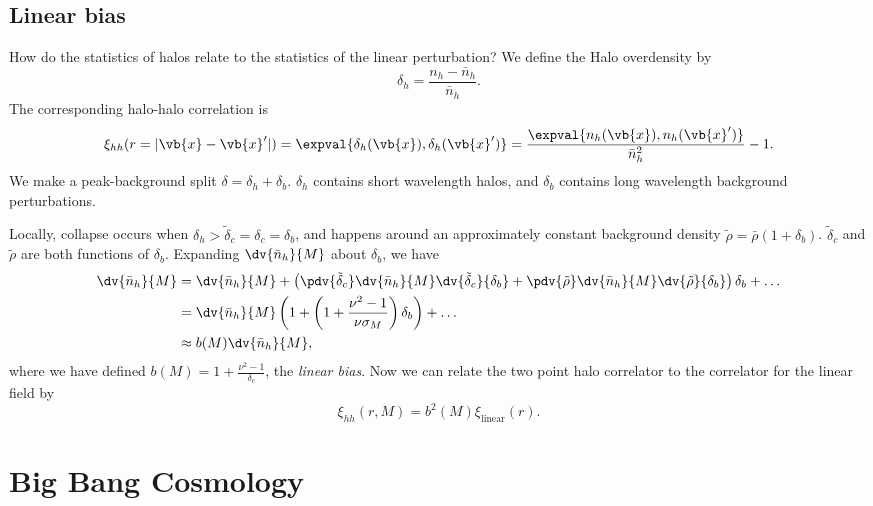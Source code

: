 \documentclass{jknotes}
\begin{document}
\subsection{Linear bias}
How do the statistics of halos relate to the statistics of the linear perturbation? We define the Halo overdensity by
\begin{equation}
    \delta_h = \frac{n_h-\bar{n}_h}{\bar{n}_h}.
\end{equation}
The corresponding halo-halo correlation is 
\begin{equation}
    \xi_{hh}(r=|\vb{x}-\vb{x}'|) = \expval{\delta_h(\vb{x}),\delta_h(\vb{x}')} = \frac{\expval{n_h(\vb{x}),n_h(\vb{x}')}}{\bar{n}_h^2} - 1.
\end{equation}
We make a peak-background split \(\delta=\delta_h+\delta_b\). \(\delta_h\) contains short wavelength halos, and \(\delta_b\) contains long wavelength background perturbations.

Locally, collapse occurs when \(\delta_h > \tilde{\delta}_c = \delta_c = \delta_b\), and happens around an approximately constant background density \(\tilde\rho = \bar\rho(1+\delta_b)\). \(\tilde{\delta}_c\) and \(\tilde{\rho}\) are both functions of \(\delta_b\). Expanding \(\dv{\bar{n}_h}{M}\) about \(\delta_b\), we have
\begin{align}
    \dv{\bar{n}_h}{M} &= \dv{\bar{n}_h}{M} + \left(\pdv{\tilde{\delta}_c}\dv{\bar{n}_h}{M}\dv{\tilde\delta_c}{\delta_b} + \pdv{\tilde\rho}\dv{\bar{n}_h}{M}\dv{\tilde\rho}{\delta_b}\right)\delta_b + \dots \\
                      &= \dv{\bar{n}_h}{M} \left( 1 + \left(1+\frac{\nu^2-1}{\nu\sigma_M}\right)\delta_b\right) + \dots \\
                      &\approx b(M) \dv{\bar{n}_h}{M},
\end{align}
where we have defined \(b(M) = 1 + \frac{\nu^2-1}{\delta_c}\), the \emph{linear bias}. Now we can relate the two point halo correlator to the correlator for the linear field by
\begin{equation}
    \xi_{hh}(r,M) = b^2(M) \xi_{\text{linear}}(r).
\end{equation}

\section{Big Bang Cosmology}
\end{document}

